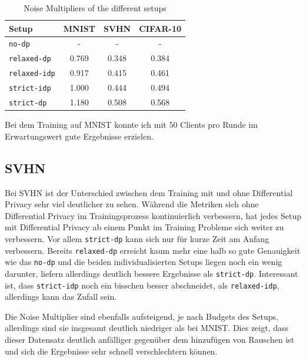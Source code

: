 \begin{table}
	\centering
	\begin{tabular}{|l|c|c|c|}
		\hline
		Setup & MNIST & SVHN & CIFAR-10 \\
		\hline
		\texttt{no-dp} & - & - & - \\
		\texttt{relaxed-dp} & 0.769 & 0.348 & 0.384 \\
		\texttt{relaxed-idp} & 0.917 & 0.415 & 0.461 \\
		\texttt{strict-idp} & 1.000 & 0.444 & 0.494 \\
		\texttt{strict-dp} & 1.180 & 0.508 & 0.568 \\
		\hline
	\end{tabular}
	\caption{Noise Multipliers of the different setups}
	\label{tab:noise-multipliers}
\end{table}

Bei dem Training auf MNIST konnte ich mit $50$ Clients pro Runde im Erwartungswert gute Ergebnisse erzielen.

\subsection{SVHN}

Bei SVHN ist der Unterschied zwischen dem Training mit und ohne Differential Privacy sehr viel deutlicher zu sehen. Während die Metriken sich ohne Differential Privacy im Trainingsprozess kontinuierlich verbessern, hat jedes Setup mit Differential Privacy ab einem Punkt im Training Probleme sich weiter zu verbessern. Vor allem \texttt{strict-dp} kann sich nur für kurze Zeit am Anfang verbessern. Bereits \texttt{relaxed-dp} erreicht kaum mehr eine halb so gute Genauigkeit wie das \texttt{no-dp} und die beiden individualisierten Setups liegen noch ein wenig darunter, liefern allerdings deutlich bessere Ergebnisse als \texttt{strict-dp}. Interessant ist, dass \texttt{strict-idp} noch ein bisschen besser abschneidet, als \texttt{relaxed-idp}, allerdings kann das Zufall sein.

Die Noise Multiplier sind ebenfalls aufsteigend, je nach Budgets des Setups, allerdings sind sie insgesamt deutlich niedriger als bei MNIST. Dies zeigt, dass dieser Datensatz deutlich anfälliger gegenüber dem hinzufügen von Rauschen ist und sich die Ergebnisse sehr schnell verschlechtern können.

